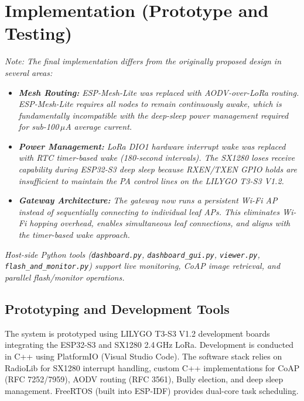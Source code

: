 \documentclass[12pt,a4paper]{article}
\begin{document}
\newpage


\section{Implementation (Prototype and Testing)}

\textit{Note: The final implementation differs from the originally proposed design in several areas:}

\begin{itemize}
    \item \textit{\textbf{Mesh Routing:} ESP-Mesh-Lite was replaced with AODV-over-LoRa routing. ESP-Mesh-Lite requires all nodes to remain continuously awake, which is fundamentally incompatible with the deep-sleep power management required for sub-100\,$\mu$A average current.}
    \item \textit{\textbf{Power Management:} LoRa DIO1 hardware interrupt wake was replaced with RTC timer-based wake (180-second intervals). The SX1280 loses receive capability during ESP32-S3 deep sleep because RXEN/TXEN GPIO holds are insufficient to maintain the PA control lines on the LILYGO T3-S3 V1.2.}
    \item \textit{\textbf{Gateway Architecture:} The gateway now runs a persistent Wi-Fi AP instead of sequentially connecting to individual leaf APs. This eliminates Wi-Fi hopping overhead, enables simultaneous leaf connections, and aligns with the timer-based wake approach.}
\end{itemize}

\textit{Host-side Python tools (\texttt{dashboard.py}, \texttt{dashboard\_gui.py}, \texttt{viewer.py}, \texttt{flash\_and\_monitor.py}) support live monitoring, CoAP image retrieval, and parallel flash/monitor operations.}

\subsection{Prototyping and Development Tools}

The system is prototyped using LILYGO T3-S3 V1.2 development boards integrating the ESP32-S3 and SX1280 2.4\,GHz LoRa. Development is conducted in C++ using PlatformIO (Visual Studio Code). The software stack relies on RadioLib for SX1280 interrupt handling, custom C++ implementations for CoAP (RFC 7252/7959), AODV routing (RFC 3561), Bully election, and deep sleep management. FreeRTOS (built into ESP-IDF) provides dual-core task scheduling.
\end{document}
